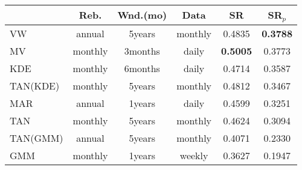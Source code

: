 \begin{tabular}{l*{5}{S[table-format=1.4]}}
  \toprule
  & {Reb.} & {Wnd.(mo)} & {Data} & {SR} & {SR$_p$} \\
  \midrule
  VW & {annual} & {5years} & {monthly} & 0.4835 & {\bfseries 0.3788} \\
  MV & {monthly} & {3months} & {daily} & {\bfseries 0.5005} & 0.3773 \\
  KDE & {monthly} & {6months} & {daily} & 0.4714 & 0.3587 \\
  TAN(KDE) & {monthly} & {5years} & {monthly} & 0.4812 & 0.3467 \\
  MAR & {annual} & {1years} & {daily} & 0.4599 & 0.3251 \\
  TAN & {monthly} & {5years} & {monthly} & 0.4624 & 0.3094 \\
  TAN(GMM) & {annual} & {5years} & {monthly} & 0.4071 & 0.2330 \\
  GMM & {monthly} & {1years} & {weekly} & 0.3627 & 0.1947 \\
  \bottomrule
\end{tabular}

